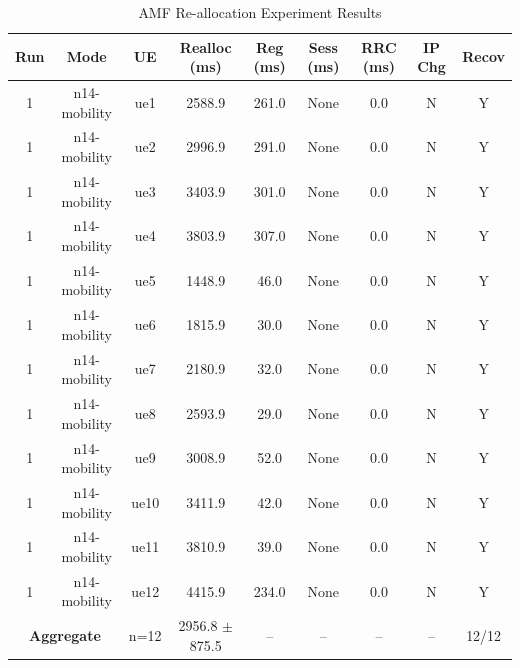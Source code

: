 \begin{table}[ht]
\centering
\begin{tabular}{|c|c|c|c|c|c|c|c|c|}
\hline
Run & Mode & UE & Realloc (ms) & Reg (ms) & Sess (ms) & RRC (ms) & IP Chg & Recov \\
\hline
1 & n14-mobility & ue1 & 2588.9 & 261.0 & None & 0.0 & N & Y \\
1 & n14-mobility & ue2 & 2996.9 & 291.0 & None & 0.0 & N & Y \\
1 & n14-mobility & ue3 & 3403.9 & 301.0 & None & 0.0 & N & Y \\
1 & n14-mobility & ue4 & 3803.9 & 307.0 & None & 0.0 & N & Y \\
1 & n14-mobility & ue5 & 1448.9 & 46.0 & None & 0.0 & N & Y \\
1 & n14-mobility & ue6 & 1815.9 & 30.0 & None & 0.0 & N & Y \\
1 & n14-mobility & ue7 & 2180.9 & 32.0 & None & 0.0 & N & Y \\
1 & n14-mobility & ue8 & 2593.9 & 29.0 & None & 0.0 & N & Y \\
1 & n14-mobility & ue9 & 3008.9 & 52.0 & None & 0.0 & N & Y \\
1 & n14-mobility & ue10 & 3411.9 & 42.0 & None & 0.0 & N & Y \\
1 & n14-mobility & ue11 & 3810.9 & 39.0 & None & 0.0 & N & Y \\
1 & n14-mobility & ue12 & 4415.9 & 234.0 & None & 0.0 & N & Y \\
\multicolumn{2}{|c|}{\textbf{Aggregate}} & n=12 & 2956.8 $\pm$ 875.5 & -- & -- & -- & -- & 12/12 \\
\hline
\end{tabular}
\caption{AMF Re-allocation Experiment Results}
\label{tab:amf_realloc}
\end{table}
